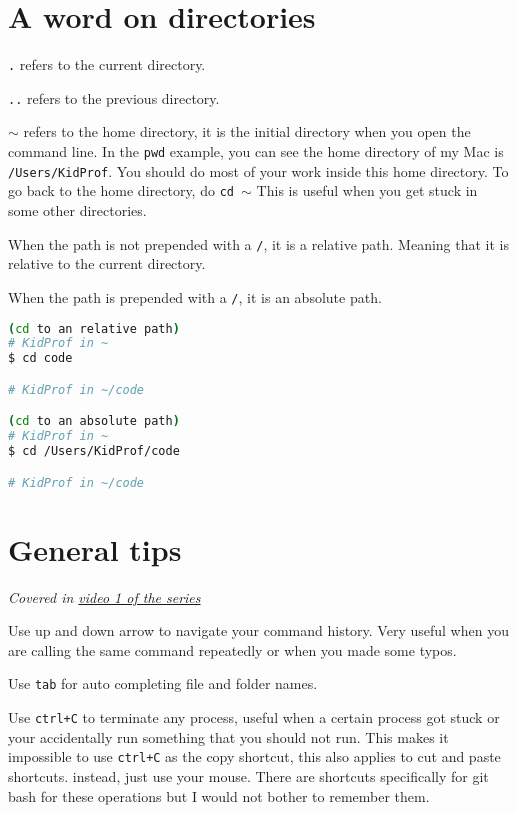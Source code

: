 \section{A word on directories}
\label{sec:dir}
\texttt{.} refers to the current directory.

\texttt{..} refers to the previous directory.
\vspace{6mm}

\texttt{$\sim$} refers to the home directory, it is the initial directory when you open the command line. In the \texttt{pwd} example, you can see the home directory of my Mac is \texttt{/Users/KidProf}. You should do most of your work inside this home directory. To go back to the home directory, do \texttt{cd $\sim$} This is useful when you get stuck in some other directories.
\vspace{6mm}

When the path is not prepended with a \texttt{/}, it is a relative path. Meaning that it is relative to the current directory.

When the path is prepended with a \texttt{/}, it is an absolute path. 

\begin{lstlisting}[language=bash]
(cd to an relative path)
# KidProf in ~
$ cd code

# KidProf in ~/code

(cd to an absolute path)
# KidProf in ~
$ cd /Users/KidProf/code

# KidProf in ~/code
\end{lstlisting}

\section{General tips}

\textit{Covered in \href{https://www.youtube.com/watch?v=oIsH0V3fRt8&list=PLjGmdnqrOKuYXiu7lgG5HW71jPEUd1XCm&index=2}{video 1 of the series}}
\vspace{6mm}

Use up and down arrow to navigate your command history. Very useful when you are calling the same command repeatedly or when you made some typos.
\vspace{6mm}

Use \texttt{tab} for auto completing file and folder names.
\vspace{6mm}

Use \texttt{ctrl+C} to terminate any process, useful when a certain process got stuck or your accidentally run something that you should not run. 
This makes it impossible to use \texttt{ctrl+C} as the copy shortcut, this also applies to cut and paste shortcuts. instead, just use your mouse. There are shortcuts specifically for git bash for these operations but I would not bother to remember them.
\vspace{6mm}

